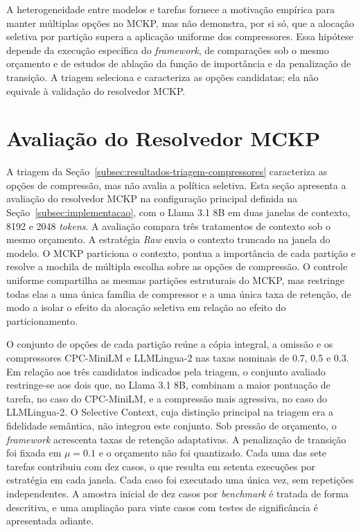 A heterogeneidade entre modelos e tarefas fornece a motivação empírica para manter múltiplas opções no MCKP, mas não demonstra, por si só, que a alocação seletiva por partição supera a aplicação uniforme dos compressores. Essa hipótese depende da execução específica do \textit{framework}, de comparações sob o mesmo orçamento e de estudos de ablação da função de importância e da penalização de transição. A triagem seleciona e caracteriza as opções candidatas; ela não equivale à validação do resolvedor MCKP.

\section{Avaliação do Resolvedor MCKP}
\label{sec:avaliacao-mckp}

A triagem da Seção~\ref{subsec:resultados-triagem-compressores} caracteriza as opções de compressão, mas não avalia a política seletiva. Esta seção apresenta a avaliação do resolvedor MCKP na configuração principal definida na Seção~\ref{subsec:implementacao}, com o Llama 3.1 8B em duas janelas de contexto, 8192 e 2048 \textit{tokens}. A avaliação compara três tratamentos de contexto sob o mesmo orçamento. A estratégia \textit{Raw} envia o contexto truncado na janela do modelo. O MCKP particiona o contexto, pontua a importância de cada partição e resolve a mochila de múltipla escolha sobre as opções de compressão. O controle uniforme compartilha as mesmas partições estruturais do MCKP, mas restringe todas elas a uma única família de compressor e a uma única taxa de retenção, de modo a isolar o efeito da alocação seletiva em relação ao efeito do particionamento.

O conjunto de opções de cada partição reúne a cópia integral, a omissão e os compressores CPC-MiniLM e LLMLingua-2 nas taxas nominais de 0.7, 0.5 e 0.3. Em relação aos três candidatos indicados pela triagem, o conjunto avaliado restringe-se aos dois que, no Llama 3.1 8B, combinam a maior pontuação de tarefa, no caso do CPC-MiniLM, e a compressão mais agressiva, no caso do LLMLingua-2. O Selective Context, cuja distinção principal na triagem era a fidelidade semântica, não integrou este conjunto. Sob pressão de orçamento, o \textit{framework} acrescenta taxas de retenção adaptativas. A penalização de transição foi fixada em $\mu = 0.1$ e o orçamento não foi quantizado. Cada uma das sete tarefas contribuiu com dez casos, o que resulta em setenta execuções por estratégia em cada janela. Cada caso foi executado uma única vez, sem repetições independentes. A amostra inicial de dez casos por \textit{benchmark} é tratada de forma descritiva, e uma ampliação para vinte casos com testes de significância é apresentada adiante.


